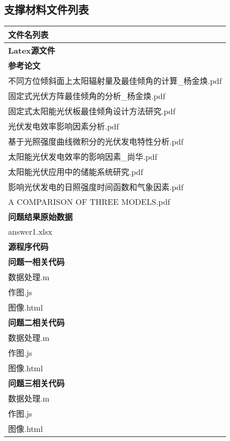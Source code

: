 \documentclass[withoutpreface,bwprint]{cumcmthesis} %
\begin{document}
\begin{appendices}

\section{支撑材料文件列表}

\begin{table}[!htbp]
	\label{tab:001} \centering
	\setlength{\tabcolsep}{25mm}
	\begin{tabular*}{\hsize}{@{}@{\extracolsep{\fill}}l@{}}
		\toprule[1.5pt]
		\qquad 文件名列表 \\
		\midrule[1pt]
		\qquad \textbf{Latex源文件} \\
		\qquad \textbf{参考论文} \\
		\qquad \qquad  不同方位倾斜面上太阳辐射量及最佳倾角的计算\_杨金焕.pdf\\
		\qquad \qquad  固定式光伏方阵最佳倾角的分析\_杨金焕.pdf\\
		\qquad \qquad  固定式太阳能光伏板最佳倾角设计方法研究.pdf\\
		\qquad \qquad  光伏发电效率影响因素分析.pdf\\
		\qquad \qquad  基于光照强度曲线微积分的光伏发电特性分析.pdf\\
		\qquad \qquad  太阳能光伏发电效率的影响因素\_尚华.pdf\\
		\qquad \qquad  太阳能光伏应用中的储能系统研究.pdf\\
		\qquad \qquad  影响光伏发电的日照强度时间函数和气象因素.pdf\\
		\qquad \qquad  A COMPARISON OF THREE MODELS.pdf\\
		\qquad \textbf{问题结果原始数据} \\
		\qquad \qquad answer1.xlsx \\
		\qquad \textbf{源程序代码}\\
		\qquad \qquad \textbf{问题一相关代码} \\
		\qquad \qquad \qquad 数据处理.m \\
		\qquad \qquad \qquad 作图.js \\
		\qquad \qquad \qquad 图像.html \\
		\qquad \qquad \textbf{问题二相关代码} \\
		\qquad \qquad \qquad 数据处理.m \\
		\qquad \qquad \qquad 作图.js \\
		\qquad \qquad \qquad 图像.html \\
		\qquad \qquad \textbf{问题三相关代码} \\
		\qquad \qquad \qquad 数据处理.m \\
		\qquad \qquad \qquad 作图.js \\
		\qquad \qquad \qquad 图像.html \\
		\bottomrule[1.5pt]
	\end{tabular*}
\end{table}










\end{appendices}
\end{document}
